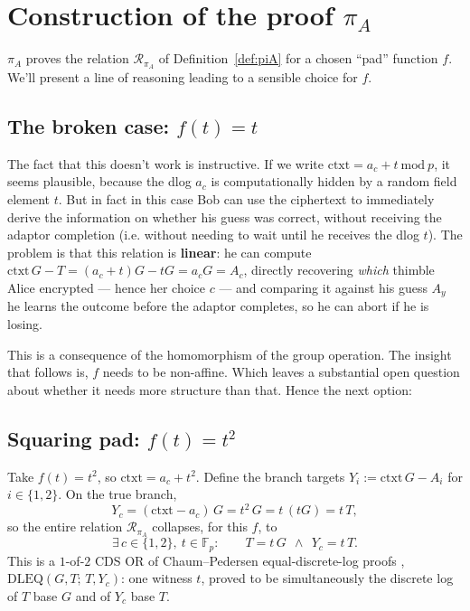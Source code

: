\documentclass[11pt]{article}
\begin{document}
\section{Construction of the proof $\pi_A$}
\label{sec:pia}

$\pi_A$ proves the relation $\mathcal{R}_{\pi_A}$ of Definition~\ref{def:piA} for a chosen ``pad'' function $f$. We'll present a line of reasoning leading to a sensible choice for $f$.

\subsection{The broken case: $f(t)=t$}

The fact that this doesn't work is instructive. If we write $\textrm{ctxt} = a_c + t \ \textrm{mod}\ p$, it seems plausible, because the dlog $a_c$ is computationally hidden by a random field element $t$. But in fact in this case Bob can use the ciphertext to immediately derive the information on whether his guess was correct, without receiving the adaptor completion (i.e. without needing to wait until he receives the dlog $t$). The problem is that this relation is \textbf{linear}: he can compute $\textrm{ctxt}\,G - T = (a_c + t)G - tG = a_c G = A_c$, directly recovering \emph{which} thimble Alice encrypted --- hence her choice $c$ --- and comparing it against his guess $A_y$ he learns the outcome before the adaptor completes, so he can abort if he is losing.

This is a consequence of the homomorphism of the group operation. The insight that follows is, $f$ needs to be non-affine. Which leaves a substantial open question about whether it needs more structure than that. Hence the next option:

\subsection{Squaring pad: $f(t)=t^2$}
\label{sec:squaring-proof}

Take $f(t)=t^2$, so $\textrm{ctxt}=a_c+t^2$. Define the branch targets $Y_i := \textrm{ctxt}\,G - A_i$ for $i\in\{1,2\}$. On the true branch,
\[
Y_c = (\textrm{ctxt}-a_c)\,G = t^2\,G = t\,(tG) = t\,T,
\]
so the entire relation $\mathcal{R}_{\pi_A}$ collapses, for this $f$, to
\[
\exists\,c\in\{1,2\},\ t\in\mathbb{F}_p:\qquad T = t\,G\ \ \wedge\ \ Y_c = t\,T.
\]
This is a $1$-of-$2$ CDS OR \cite{cds} of Chaum--Pedersen equal-discrete-log proofs \cite{chaumpedersen}, $\mathrm{DLEQ}(G,T;\,T,Y_c)$: one witness $t$, proved to be simultaneously the discrete log of $T$ base $G$ and of $Y_c$ base $T$.
\end{document}

